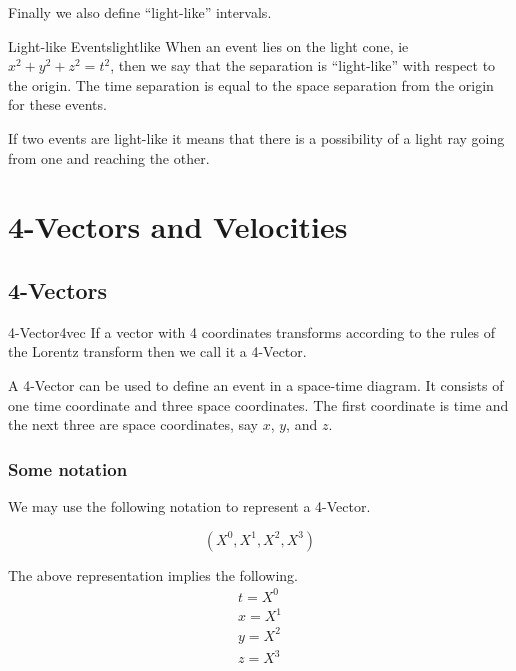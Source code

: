 \documentclass[16pt]{scrartcl}
\numberwithin{equation}{section}
\theoremstyle{plain}
\theoremstyle{definition}
\begin{document}
Finally we also define ``light-like'' intervals.

\begin{defn}{Light-like Events}{lightlike}
    When an event lies on the light cone, ie $x^2+y^2+z^2 = t^2$, then we say that the separation is ``light-like'' with respect to the origin. The time separation is equal to the space separation from the origin for these events.
\end{defn}

If two events are light-like it means that there is a possibility of a light ray going from one and reaching the other.

\section{4-Vectors and Velocities}

\subsection{4-Vectors}

\begin{defn}{4-Vector}{4vec}
    If a vector with 4 coordinates transforms according to the rules of the Lorentz transform then we call it a 4-Vector.
\end{defn}

A 4-Vector can be used to define an event in a space-time diagram. It consists of one time coordinate and three space coordinates. The first coordinate is time and the next three are space coordinates, say $x$, $y$, and $z$.

\subsubsection*{Some notation}

We may use the following notation to represent a 4-Vector.

\begin{equation}
    (X^0, X^1, X^2, X^3)
    \label{eq:4-vector}
\end{equation}

The above representation implies the following.
\begin{gather}
    t = X^0\\
    x = X^1\\
    y = X^2\\
    z = X^3
    \label{eq:4-vector-comps}
\end{gather}
\end{document}
